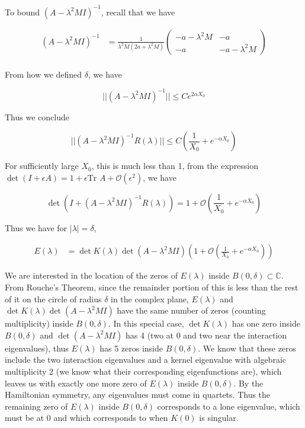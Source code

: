 \documentclass[12pt]{article}
\def\C{{\mathbb C}}
\begin{document}
\begin{enumerate}
To bound $(A - \lambda^2 MI)^{-1}$, recall that we have

\begin{align*}
(A - \lambda^2 M I)^{-1} &=
\frac{1}{\lambda^2 M(2a + \lambda^2 M)}
\begin{pmatrix}
-a - \lambda^2 M & -a \\
-a & -a - \lambda^2 M
\end{pmatrix} \\
\end{align*}

From how we defined $\delta$, we have

\[
||(A - \lambda^2 M I)^{-1}|| \leq C e^{2 \alpha X_0}
\]

Thus we conclude

\[
||(A - \lambda^2 MI)^{-1} R(\lambda)|| \leq C \left( \frac{1}{X_0} + e^{-\alpha X_0} \right)
\]

For sufficiently large $X_0$, this is much less than 1, from the expression $\det(I + \epsilon A) = 1 + \epsilon \text{Tr }A + \mathcal{O}(\epsilon^2)$, we have

\[
\det (I + (A - \lambda^2 MI)^{-1} R(\lambda) ) 
= 1 + \mathcal{O}\left( \frac{1}{X_0} + e^{-\alpha X_0} \right)
\]

Thus we have for $|\lambda| = \delta$,

\begin{align*}
E(\lambda) &= \det K(\lambda) \det(A - \lambda^2 MI) \left( 1 + \mathcal{O}\left( \frac{1}{X_0} + e^{-\alpha X_0} \right) \right)
\end{align*}

We are interested in the location of the zeros of $E(\lambda)$ inside $B(0, \delta) \subset \C$. From Rouche's Theorem, since the remainder portion of this is less than the rest of it on the circle of radius $\delta$ in the complex plane, $E(\lambda)$ and $\det K(\lambda) \det(A - \lambda^2 MI)$ have the same number of zeros (counting multiplicity) inside $B(0, \delta)$. In this special case, $\det K(\lambda)$ has one zero inside $B(0, \delta)$ and $\det(A - \lambda^2 MI)$ has 4 (two at 0 and two near the interaction eigenvalues), thus $E(\lambda)$ has 5 zeros inside $B(0, \delta)$. We know that these zeros include the two interaction eigenvalues and a kernel eigenvalue with algebraic multiplicity 2 (we know what their corresponding eigenfunctions are), which leaves us with exactly one more zero of $E(\lambda)$ inside $B(0, \delta)$. By the Hamiltonian symmetry, any eigenvalues must come in quartets. Thus the remaining zero of $E(\lambda)$ inside $B(0, \delta)$ corresponds to a lone eigenvalue, which must be at 0 and which corresponds to when $K(0)$ is singular.


\end{enumerate}
\end{document}
